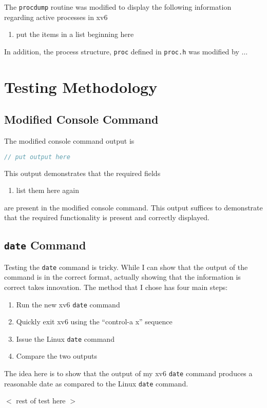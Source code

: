 \documentclass[12pt,letterpaper]{report}
\begin{document}
	The \texttt{procdump} routine was modified to display the following information regarding active processes in xv6
	\begin{enumerate}
	\item put the items in a list beginning here
	\end{enumerate}
	
	In addition, the process structure, \texttt{proc} defined in \texttt{proc.h} was modified by $\ldots$
	
	
	\section*{Testing Methodology}
	
	\subsection*{Modified Console Command}
	The modified console command output is
\begin{lstlisting}[language=C]
// put output here
\end{lstlisting}

	This output demonstrates that the required fields
	\begin{enumerate}
	\item list them here again
	\end{enumerate}
	are present in the modified console command. This output suffices to demonstrate that the required functionality is present and correctly displayed.
	
	\subsection*{\texttt{date} Command}
	Testing the \texttt{date} command is tricky. While I can show that the output of the command is in the correct format, actually showing that the information is correct takes innovation. The method that I chose has four main steps:
	\begin{enumerate}
	\item Run the new xv6 \texttt{date} command
	\item Quickly exit xv6 using the ``control-a x'' sequence
	\item Issue the Linux \texttt{date} command
	\item Compare the two outputs
	\end{enumerate}
	The idea here is to show that the output of my xv6 \texttt{date} command produces a reasonable date as compared to the Linux \texttt{date} command. 
	
	$<$ rest of test here $>$
	
\end{document}
